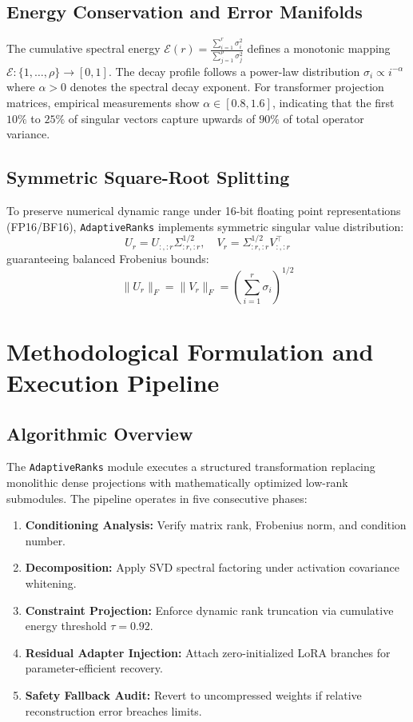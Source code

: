 \subsection{Energy Conservation and Error Manifolds}
The cumulative spectral energy $\mathcal{E}(r) = \frac{\sum_{i=1}^r \sigma_i^2}{\sum_{j=1}^\rho \sigma_j^2}$ defines a monotonic mapping $\mathcal{E}: \{1, \dots, \rho\} \to [0, 1]$. The decay profile follows a power-law distribution $\sigma_i \propto i^{-\alpha}$ where $\alpha > 0$ denotes the spectral decay exponent. For transformer projection matrices, empirical measurements show $\alpha \in [0.8, 1.6]$, indicating that the first $10\%$ to $25\%$ of singular vectors capture upwards of $90\%$ of total operator variance.

\subsection{Symmetric Square-Root Splitting}
To preserve numerical dynamic range under 16-bit floating point representations (FP16/BF16), \texttt{AdaptiveRanks} implements symmetric singular value distribution:
\[
U_r = U_{:, :r} \Sigma_{:r, :r}^{1/2}, \quad V_r = \Sigma_{:r, :r}^{1/2} V_{:, :r}^\top
\]
guaranteeing balanced Frobenius bounds:
\[
\|U_r\|_F = \|V_r\|_F = \left( \sum_{i=1}^{r} \sigma_i \right)^{1/2}
\]


\section{Methodological Formulation and Execution Pipeline}

\subsection{Algorithmic Overview}
The \texttt{AdaptiveRanks} module executes a structured transformation replacing monolithic dense projections with mathematically optimized low-rank submodules. The pipeline operates in five consecutive phases:
\begin{enumerate}
  \item \textbf{Conditioning Analysis:} Verify matrix rank, Frobenius norm, and condition number.
  \item \textbf{Decomposition:} Apply SVD spectral factoring under activation covariance whitening.
  \item \textbf{Constraint Projection:} Enforce dynamic rank truncation via cumulative energy threshold $\tau = 0.92$.
  \item \textbf{Residual Adapter Injection:} Attach zero-initialized LoRA branches for parameter-efficient recovery.
  \item \textbf{Safety Fallback Audit:} Revert to uncompressed weights if relative reconstruction error breaches limits.
\end{enumerate}

